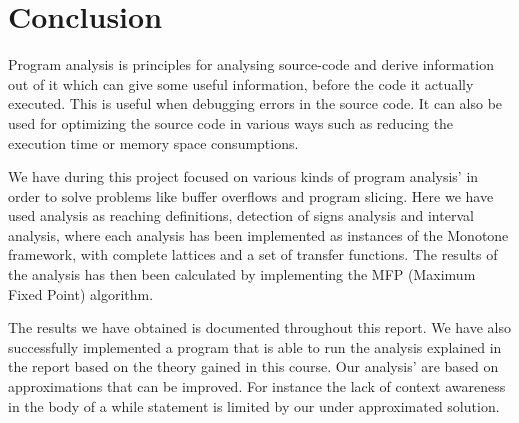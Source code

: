 \chapter{Conclusion}


Program analysis is principles for analysing source-code and derive information out of it which can give some useful information, before the code it actually executed. This is useful when debugging errors in the source code. It can also be used for optimizing the source code in various ways such as reducing the execution time or memory space consumptions.

We have during this project focused on various kinds of program analysis' in order to solve problems like buffer overflows and program slicing. Here we have used analysis as reaching definitions, detection of signs analysis and interval analysis, where each analysis has been implemented as instances of the Monotone framework, with complete lattices and a set of transfer functions.
The results of the analysis has then been calculated by implementing the MFP (Maximum Fixed Point) algorithm.

The results we have obtained is documented throughout this report.
We have also successfully implemented a program that is able to run the analysis explained in the report based on the theory gained in this course. Our analysis' are based on approximations that can be improved. For instance the lack of context awareness in the body of a while statement is limited by our under approximated solution.